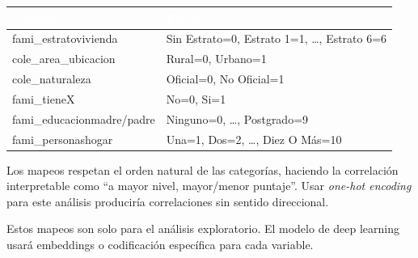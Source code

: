 \documentclass[12pt, a4paper]{article}
\newcommand{\thead}[1]{\cellcolor{tabheader}\textcolor{white}{\textbf{#1}}}
\begin{document}
\vspace{4pt}
\begin{tabularx}{\textwidth}{>{\ttfamily}l X}
  \toprule
  \thead{Variable} & \thead{Escala} \\
  \midrule
  \rowcolor{rowalt}
  fami\_estratovivienda  & Sin Estrato=0, Estrato 1=1, \ldots, Estrato 6=6 \\
  cole\_area\_ubicacion  & Rural=0, Urbano=1 \\
  \rowcolor{rowalt}
  cole\_naturaleza       & Oficial=0, No Oficial=1 \\
  fami\_tieneX           & No=0, Si=1 \\
  \rowcolor{rowalt}
  fami\_educacionmadre/padre & Ninguno=0, \ldots, Postgrado=9 \\
  fami\_personashogar    & Una=1, Dos=2, \ldots, Diez O Más=10 \\
  \bottomrule
\end{tabularx}
\vspace{6pt}

Los mapeos respetan el orden natural de las categorías, haciendo la correlación
interpretable como ``a mayor nivel, mayor/menor puntaje''. Usar \textit{one-hot
encoding} para este análisis produciría correlaciones sin sentido direccional.

\begin{nota}
  Estos mapeos son solo para el análisis exploratorio. El modelo de deep
  learning usará embeddings o codificación específica para cada variable.
\end{nota}

\end{document}
